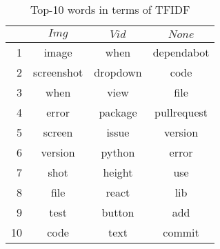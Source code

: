 \begin{table}[t]
  \begin{center}
  \caption{Top-10 words in terms of TFIDF}
  \begin{tabular}{r | c c c}
    \hline
     & $Img$ & $Vid$ & $None$\\
    \hline
    1 & image & when & dependabot\\
    2 & screenshot & dropdown & code\\
    3 & when & view & file\\
    4 & error & package & pullrequest\\
    5 & screen & issue & version\\
    6 & version & python & error\\
    7 & shot & height & use\\
    8 & file & react & lib\\
    9 & test & button & add\\
    10& code & text & commit\\
    \hline
  \end{tabular}\\
  \label{tab:tfidf-result}
  \end{center}
\end{table}
